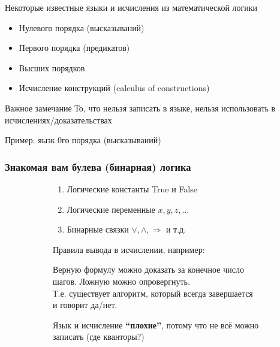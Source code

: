  \begin{frame}{Некоторые известные языки и исчисления из математической логики}
 	\begin{itemize}
 		\item Нулевого порядка (высказываний)
 		\item Первого порядка (предикатов)
 		\item Высших порядков
 		\item Исчисление конструкций (calculus of constructions)
 	\end{itemize}
 	\begin{block}{Важное замечание}
 		То, что нельзя записать в языке, нельзя использовать в исчислениях/доказательствах
 	\end{block}
 \end{frame}

 \begin{frame}{Пример: яызк 0го порядка (высказываний) }
 	\frametitle{Знакомая вам булева (бинарная) логика}
 	\begin{figure}[t]
 		\begin{subfigure}[t]{0.45\textwidth}
 			\begin{enumerate}
 				\item Логические константы True и False
 				\item Логические переменные $x,y,z,\dots$
 				\item Бинарные связки $\vee, \wedge, \Rightarrow$ и т.д.
 			\end{enumerate}
 			\vspace{2em}
 			Правила вывода в исчислении, например:
 			\begin{mathpar}
 			\end{mathpar}
 		\end{subfigure}
 		\hspace{0.05\textwidth}
 		\begin{subfigure}[t]{0.46\textwidth}
 			\begin{theorem}
 				Верную формулу можно доказать за конечное число шагов. Ложную можно опровергнуть.\\

 				Т.е. существует алгоритм, который всегда завершается и говорит да/нет.
 			\end{theorem}
 			\vspace{2em}
 			Язык и исчисление \textbf{``плохие''}, потому что не всё можно записать (где кванторы?)
 		\end{subfigure}
 	\end{figure}


 \end{frame}



